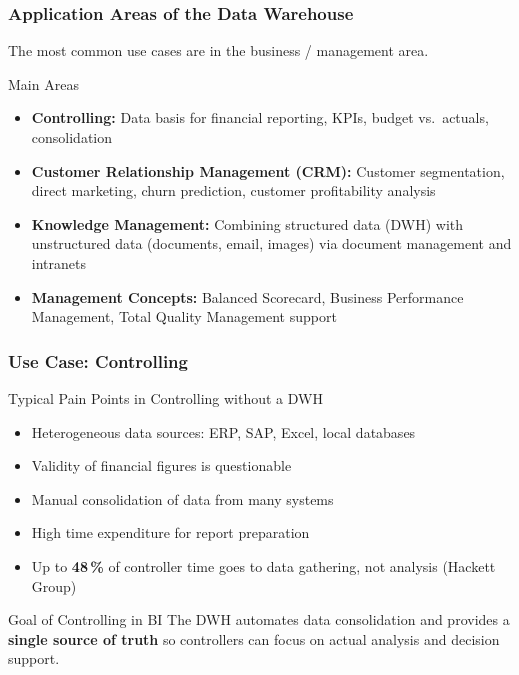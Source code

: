 
\begin{frame}
  \frametitle{Application Areas of the Data Warehouse}

  The most common use cases are in the business / management area.

  \begin{block}{Main Areas}
    \begin{itemize}
      \item \textbf{Controlling:} Data basis for financial reporting, KPIs,
        budget vs.\ actuals, consolidation
      \item \textbf{Customer Relationship Management (CRM):}
        Customer segmentation, direct marketing, churn prediction,
        customer profitability analysis
      \item \textbf{Knowledge Management:}
        Combining structured data (DWH) with unstructured data
        (documents, email, images) via document management and intranets
      \item \textbf{Management Concepts:}
        Balanced Scorecard, Business Performance Management,
        Total Quality Management support
    \end{itemize}
  \end{block}
\end{frame}

\begin{frame}
  \frametitle{Use Case: Controlling}

  \begin{block}{Typical Pain Points in Controlling without a DWH}
    \begin{itemize}
      \item Heterogeneous data sources: ERP, SAP, Excel, local databases
      \item Validity of financial figures is questionable
      \item Manual consolidation of data from many systems
      \item High time expenditure for report preparation
      \item Up to \textbf{48\,\%} of controller time goes to data gathering,
        not analysis \hfill\small(Hackett Group)
    \end{itemize}
  \end{block}

  \begin{alertblock}{Goal of Controlling in BI}
    The DWH automates data consolidation and provides a \textbf{single
    source of truth} so controllers can focus on actual analysis and
    decision support.
  \end{alertblock}
\end{frame}

